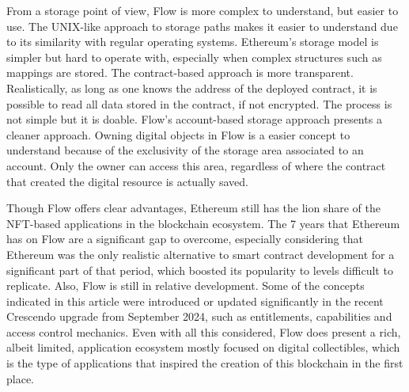 \documentclass[../NFTComp_IEEE.tex]{subfiles}
\begin{document}
\par
From a storage point of view, Flow is more complex to understand, but easier to use. The UNIX-like approach to storage paths makes it easier to understand due to its similarity with regular operating systems. Ethereum's storage model is simpler but hard to operate with, especially when complex structures such as mappings are stored. The contract-based approach is more transparent. Realistically, as long as one knows the address of the deployed contract, it is possible to read all data stored in the contract, if not encrypted. The process is not simple but it is doable. Flow's account-based storage approach presents a cleaner approach. Owning digital objects in Flow is a easier concept to understand because of the exclusivity of the storage area associated to an account. Only the owner can access this area, regardless of where the contract that created the digital resource is actually saved.
\par
Though Flow offers clear advantages, Ethereum still has the lion share of the NFT-based applications in the blockchain ecosystem. The 7 years that Ethereum has on Flow are a significant gap to overcome, especially considering that Ethereum was the only realistic alternative to smart contract development for a significant part of that period, which boosted its popularity to levels difficult to replicate. Also, Flow is still in relative development. Some of the concepts indicated in this article were introduced or updated significantly in the recent Crescendo upgrade \cite{flow2024f} from September 2024, such as entitlements, capabilities and access control mechanics. Even with all this considered, Flow does present a rich, albeit limited, application ecosystem mostly focused on digital collectibles, which is the type of applications that inspired the creation of this blockchain in the first place.
\end{document}
